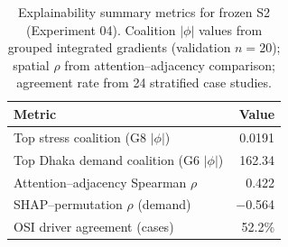 \begin{table}[!t]
\caption{Explainability summary metrics for frozen S2 (Experiment 04). Coalition $|\phi|$ values from grouped integrated gradients (validation $n{=}20$); spatial $\rho$ from attention--adjacency comparison; agreement rate from 24 stratified case studies.}
\label{tab:7}
\centering
\small
\renewcommand{\arraystretch}{1.15}
\begin{tabular}{|l|r|}
\hline
\textbf{Metric} & \textbf{Value} \\
\hline
Top stress coalition (G8 $|\phi|$) & 0.0191 \\
Top Dhaka demand coalition (G6 $|\phi|$) & 162.34 \\
Attention--adjacency Spearman $\rho$ & 0.422 \\
SHAP--permutation $\rho$ (demand) & $-$0.564 \\
OSI driver agreement (cases) & 52.2\% \\
\hline
\end{tabular}
\end{table}
